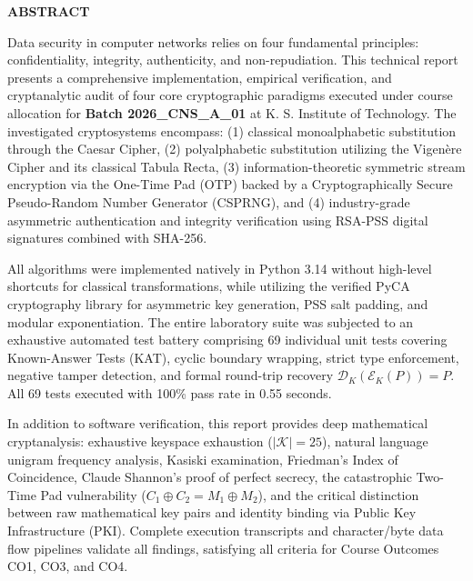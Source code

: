 \documentclass[12pt,a4paper]{report}
\renewcommand{\texttt}[1]{{\normalfont #1}}
\begin{document}
\pagestyle{preliminary}

\begin{center}
    {\fontsize{14}{16}\bfseries ABSTRACT}\\[1.5em]
\end{center}

Data security in computer networks relies on four fundamental principles: confidentiality, integrity, authenticity, and non-repudiation. This technical report presents a comprehensive implementation, empirical verification, and cryptanalytic audit of four core cryptographic paradigms executed under course allocation for \textbf{Batch 2026\_CNS\_A\_01} at K. S. Institute of Technology. The investigated cryptosystems encompass: (1) classical monoalphabetic substitution through the Caesar Cipher, (2) polyalphabetic substitution utilizing the Vigen\`ere Cipher and its classical Tabula Recta, (3) information-theoretic symmetric stream encryption via the One-Time Pad (OTP) backed by a Cryptographically Secure Pseudo-Random Number Generator (CSPRNG), and (4) industry-grade asymmetric authentication and integrity verification using RSA-PSS digital signatures combined with SHA-256.

All algorithms were implemented natively in Python 3.14 without high-level shortcuts for classical transformations, while utilizing the verified PyCA \texttt{cryptography} library for asymmetric key generation, PSS salt padding, and modular exponentiation. The entire laboratory suite was subjected to an exhaustive automated test battery comprising 69 individual unit tests covering Known-Answer Tests (KAT), cyclic boundary wrapping, strict type enforcement, negative tamper detection, and formal round-trip recovery $\mathcal{D}_K(\mathcal{E}_K(P)) = P$. All 69 tests executed with 100\% pass rate in 0.55 seconds.

In addition to software verification, this report provides deep mathematical cryptanalysis: exhaustive keyspace exhaustion ($|\mathcal{K}| = 25$), natural language unigram frequency analysis, Kasiski examination, Friedman's Index of Coincidence, Claude Shannon's proof of perfect secrecy, the catastrophic Two-Time Pad vulnerability ($C_1 \oplus C_2 = M_1 \oplus M_2$), and the critical distinction between raw mathematical key pairs and identity binding via Public Key Infrastructure (PKI). Complete execution transcripts and character/byte data flow pipelines validate all findings, satisfying all criteria for Course Outcomes CO1, CO3, and CO4.
\end{document}
